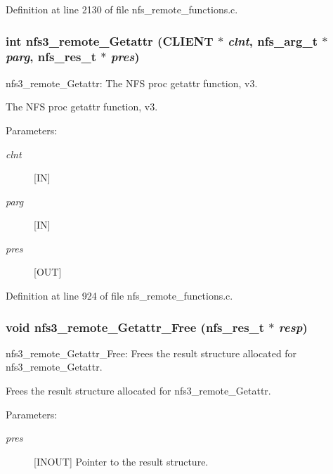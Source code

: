 Definition at line 2130 of file nfs\_\-remote\_\-functions.c.
\subsubsection[{nfs3\_\-remote\_\-Getattr}]{\setlength{\rightskip}{0pt plus 5cm}int nfs3\_\-remote\_\-Getattr (CLIENT $\ast$ {\em clnt}, \/  nfs\_\-arg\_\-t $\ast$ {\em parg}, \/  nfs\_\-res\_\-t $\ast$ {\em pres})}\label{group__NFSprocs_g49b3f4f38a6c16c3fc4386282205aac1}


nfs3\_\-remote\_\-Getattr: The NFS proc getattr function, v3.

The NFS proc getattr function, v3.

\begin{Desc}
\item[Parameters:]
\begin{description}
\item[{\em clnt}][IN] \item[{\em parg}][IN] \item[{\em pres}][OUT] \end{description}
\end{Desc}


Definition at line 924 of file nfs\_\-remote\_\-functions.c.
\subsubsection[{nfs3\_\-remote\_\-Getattr\_\-Free}]{\setlength{\rightskip}{0pt plus 5cm}void nfs3\_\-remote\_\-Getattr\_\-Free (nfs\_\-res\_\-t $\ast$ {\em resp})}\label{group__NFSprocs_g026961cae408df543c535e171e8eb7f7}


nfs3\_\-remote\_\-Getattr\_\-Free: Frees the result structure allocated for nfs3\_\-remote\_\-Getattr.

Frees the result structure allocated for nfs3\_\-remote\_\-Getattr.

\begin{Desc}
\item[Parameters:]
\begin{description}
\item[{\em pres}][INOUT] Pointer to the result structure. \end{description}
\end{Desc}


